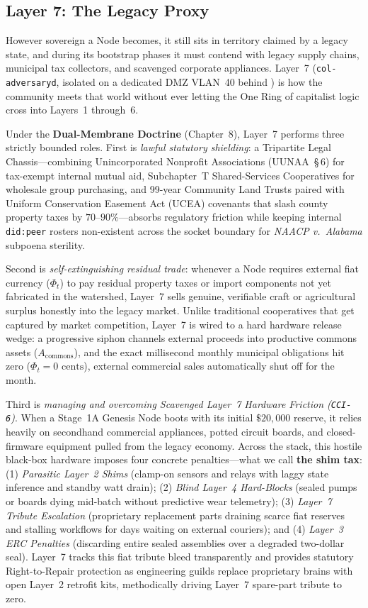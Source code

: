 \subsection{Layer 7: The Legacy Proxy}

However sovereign a Node becomes, it still sits in territory claimed by a legacy state, and during its bootstrap phases it must contend with legacy supply chains, municipal tax collectors, and scavenged corporate appliances. Layer~7 (\texttt{col-adversaryd}, isolated on a dedicated DMZ VLAN~40 behind ) is how the community meets that world without ever letting the One Ring of capitalist logic cross into Layers~1 through~6.

Under the \textbf{Dual-Membrane Doctrine} (Chapter~8), Layer~7 performs three strictly bounded roles. First is \textit{lawful statutory shielding}: a Tripartite Legal Chassis---combining Unincorporated Nonprofit Associations (UUNAA~\S\,6) for tax-exempt internal mutual aid, Subchapter~T Shared-Services Cooperatives for wholesale group purchasing, and 99-year Community Land Trusts paired with Uniform Conservation Easement Act (UCEA) covenants that slash county property taxes by $70\text{--}90\%$---absorbs regulatory friction while keeping internal \texttt{did:peer} rosters non-existent across the socket boundary for \textit{NAACP v.\ Alabama} subpoena sterility.

Second is \textit{self-extinguishing residual trade}: whenever a Node requires external fiat currency ($\Phi_t$) to pay residual property taxes or import components not yet fabricated in the watershed, Layer~7 sells genuine, verifiable craft or agricultural surplus honestly into the legacy market. Unlike traditional cooperatives that get captured by market competition, Layer~7 is wired to a hard hardware release wedge: a progressive siphon channels external proceeds into productive commons assets ($A_{\mathrm{commons}}$), and the exact millisecond monthly municipal obligations hit zero ($\Phi_t = 0\text{ cents}$), external commercial sales automatically shut off for the month.

Third is \textit{managing and overcoming Scavenged Layer~7 Hardware Friction (\texttt{CCI-6})}. When a Stage~1A Genesis Node boots with its initial $\$20{,}000$ reserve, it relies heavily on secondhand commercial appliances, potted circuit boards, and closed-firmware equipment pulled from the legacy economy. Across the stack, this hostile black-box hardware imposes four concrete penalties---what we call \textbf{the shim tax}: (1) \textit{Parasitic Layer~2 Shims} (clamp-on sensors and relays with laggy state inference and standby watt drain); (2) \textit{Blind Layer~4 Hard-Blocks} (sealed pumps or boards dying mid-batch without predictive wear telemetry); (3) \textit{Layer~7 Tribute Escalation} (proprietary replacement parts draining scarce fiat reserves and stalling workflows for days waiting on external couriers); and (4) \textit{Layer~3 ERC Penalties} (discarding entire sealed assemblies over a degraded two-dollar seal). Layer~7 tracks this fiat tribute bleed transparently and provides statutory Right-to-Repair protection as engineering guilds replace proprietary brains with open Layer~2 retrofit kits, methodically driving Layer~7 spare-part tribute to zero.


